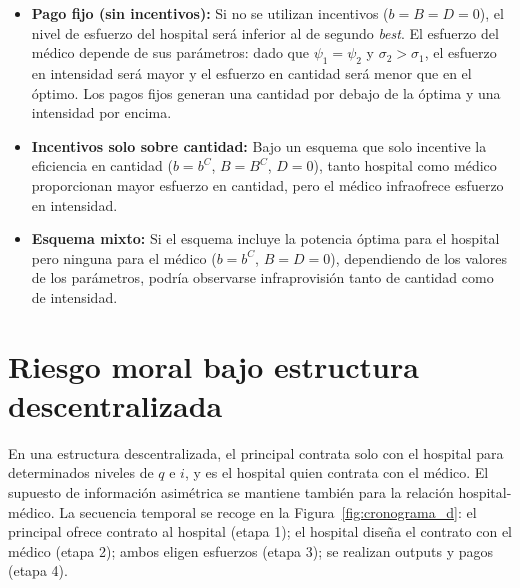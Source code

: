 \begin{itemize}
  \item \textbf{Pago fijo (sin incentivos):} Si no se utilizan incentivos ($b=B=D=0$), el nivel de esfuerzo del hospital será inferior al de segundo \textit{best}. El esfuerzo del médico depende de sus parámetros: dado que $\psi_1=\psi_2$ y $\sigma_2>\sigma_1$, el esfuerzo en intensidad será mayor y el esfuerzo en cantidad será menor que en el óptimo. Los pagos fijos generan una cantidad por debajo de la óptima y una intensidad por encima.

  \item \textbf{Incentivos solo sobre cantidad:} Bajo un esquema que solo incentive la eficiencia en cantidad ($b=b^C$, $B=B^C$, $D=0$), tanto hospital como médico proporcionan mayor esfuerzo en cantidad, pero el médico infraofrece esfuerzo en intensidad.

  \item \textbf{Esquema mixto:} Si el esquema incluye la potencia óptima para el hospital pero ninguna para el médico ($b=b^C$, $B=D=0$), dependiendo de los valores de los parámetros, podría observarse infraprovisión tanto de cantidad como de intensidad.
\end{itemize}


\section{Riesgo moral bajo estructura descentralizada}
\label{sec:descentralizada}

En una estructura descentralizada, el principal contrata solo con el hospital para determinados niveles de $q$ e $i$, y es el hospital quien contrata con el médico. El supuesto de información asimétrica se mantiene también para la relación hospital-médico. La secuencia temporal se recoge en la Figura~\ref{fig:cronograma_d}: el principal ofrece contrato al hospital (etapa 1); el hospital diseña el contrato con el médico (etapa 2); ambos eligen esfuerzos (etapa 3); se realizan outputs y pagos (etapa 4).

